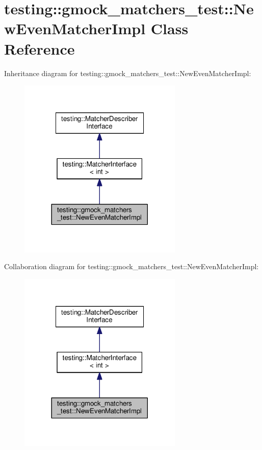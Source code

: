 \hypertarget{classtesting_1_1gmock__matchers__test_1_1NewEvenMatcherImpl}{}\section{testing\+:\+:gmock\+\_\+matchers\+\_\+test\+:\+:New\+Even\+Matcher\+Impl Class Reference}
\label{classtesting_1_1gmock__matchers__test_1_1NewEvenMatcherImpl}


Inheritance diagram for testing\+:\+:gmock\+\_\+matchers\+\_\+test\+:\+:New\+Even\+Matcher\+Impl\+:
\nopagebreak
\begin{figure}[H]
\begin{center}
\leavevmode
\includegraphics[width=221pt]{classtesting_1_1gmock__matchers__test_1_1NewEvenMatcherImpl__inherit__graph}
\end{center}
\end{figure}


Collaboration diagram for testing\+:\+:gmock\+\_\+matchers\+\_\+test\+:\+:New\+Even\+Matcher\+Impl\+:
\nopagebreak
\begin{figure}[H]
\begin{center}
\leavevmode
\includegraphics[width=221pt]{classtesting_1_1gmock__matchers__test_1_1NewEvenMatcherImpl__coll__graph}
\end{center}
\end{figure}
